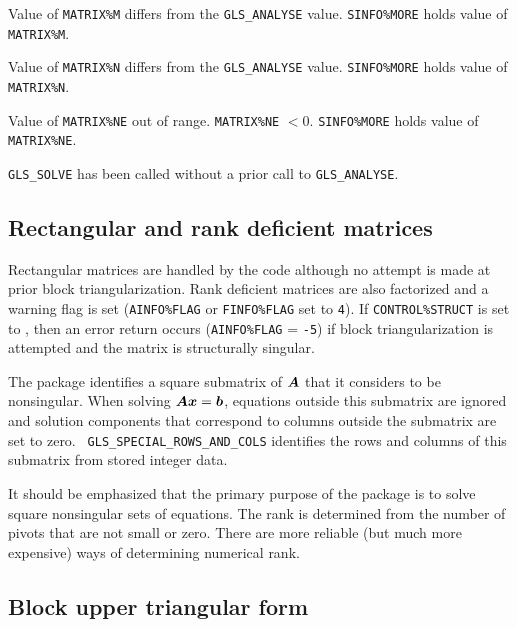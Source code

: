 \documentclass{galahad}
\newcommand{\packagename}{GLS}
\begin{document}
\begin{description}

  Value of {\tt MATRIX\%M} differs from the {\tt \packagename\_ANALYSE} 
value. {\tt SINFO\%MORE} holds value of {\tt MATRIX\%M}.

  Value of {\tt MATRIX\%N} differs from the {\tt \packagename\_ANALYSE} 
value. {\tt SINFO\%MORE} holds value of {\tt MATRIX\%N}.

  Value of {\tt MATRIX\%NE} out of range.  {\tt MATRIX\%NE} $<0$. 
{\tt SINFO\%MORE} holds value of {\tt MATRIX\%NE}.

 {\tt \packagename\_SOLVE} has been called without a prior call to
 {\tt \packagename\_ANALYSE}.

\end{description}

\subsection{Rectangular and rank deficient matrices}

Rectangular matrices are handled by the code although no attempt is made
at prior block triangularization.  Rank deficient matrices are also factorized
and a warning flag is set ({\tt AINFO\%FLAG} or {\tt FINFO\%FLAG} set to 
{\tt 4}).
If {\tt CONTROL\%STRUCT} is set to \true,
then an error return occurs ({\tt AINFO\%FLAG} = {\tt -5}) if block
triangularization is attempted and the matrix is structurally singular.

 The package identifies a square submatrix of ${\bm{A}}$ that it considers
to be nonsingular. When solving ${\bm{A}} {\bm{x}} = {\bm{b}}$, equations outside
this submatrix are ignored and solution components that correspond to
columns outside the submatrix are set to zero. {\tt
\packagename\_SPECIAL\_ROWS\_AND\_COLS} identifies the rows and columns
of this submatrix from stored integer data.

It should be emphasized that the primary purpose of the 
package is to solve square nonsingular sets of equations. The
rank is determined from the number of pivots that are not small or zero. 
There are more reliable (but much more expensive) ways of determining 
numerical rank.

\subsection{Block upper triangular form} \label{secbtf}
\end{document}
